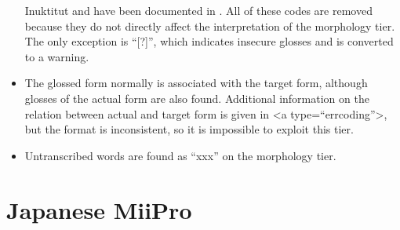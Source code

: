 \documentclass[a4paper, 11pt]{book}
\begin{document}
\begin{itemize}
		Inuktitut and have been documented in \citet{Allen1996a}. All of these codes are removed because they do not directly affect the
		interpretation of the morphology tier. The only exception is “[?]”, which indicates insecure glosses and is converted to a warning. 	
	\item The glossed form normally is associated with the target form, although glosses of the actual form are also found. Additional information on the relation between actual and target form is given in <a type=“errcoding”>, but the format is inconsistent, so it is impossible to exploit this tier.
	\item Untranscribed words are found as “xxx” on the morphology tier. 
\end{itemize}


\section{Japanese MiiPro}
\label{sec:Japanese MiiPro}
\end{document}
